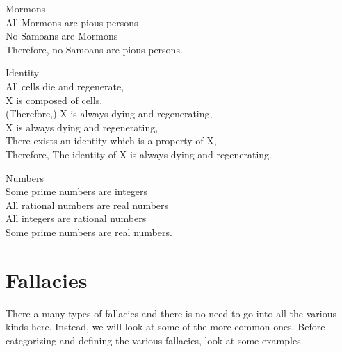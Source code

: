 \documentclass{article}
\begin{document}
\begin{syllogism} Mormons\\
All Mormons are pious persons\\
No Samoans are Mormons\\
Therefore, no Samoans are pious persons.\\
\end{syllogism}

\begin{syllogism} Identity\\
All cells die and regenerate,\\
X is composed of cells,\\
(Therefore,) X is always dying and regenerating,\\
X is always dying and regenerating,\\
There exists an identity which is a property of X,\\
Therefore, The identity of X is always dying and regenerating.\\
\end{syllogism}

\begin{syllogism} Numbers\\
Some prime numbers are integers\\
All rational numbers are real numbers\\
All integers are rational numbers\\
Some prime numbers are real numbers.\\
\end{syllogism}


\section{Fallacies}
There a many types of fallacies and there is no need to go into all the various kinds here. Instead, we will look at some of the more common ones. Before categorizing and defining the various fallacies, look at some examples.
\end{document}
